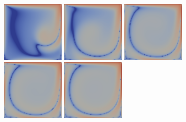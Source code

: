 \documentclass[english, nochinese]{pkupaper}
\begin{document}
\begin{figure}
{{
\includegraphics[width=3cm]{Results/Figure02k.pdf}
\includegraphics[width=3cm]{Results/Figure02l.pdf}
\includegraphics[width=3cm]{Results/Figure02m.pdf}
\includegraphics[width=3cm]{Results/Figure02n.pdf}
\includegraphics[width=3cm]{Results/Figure02o.pdf}
}

}
\end{figure}
\end{document}
